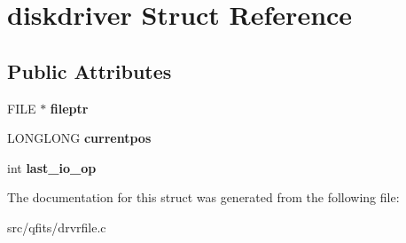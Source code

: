 \hypertarget{structdiskdriver}{}\section{diskdriver Struct Reference}
\label{structdiskdriver}
\subsection*{Public Attributes}
\begin{DoxyCompactItemize}
\item 
\mbox{\label{structdiskdriver_a05c1fe5955b89968b998b4331041f044}} 
F\+I\+LE $\ast$ {\bfseries fileptr}
\item 
\mbox{\label{structdiskdriver_afc771fe1c6668f0a0c5694b8d6cd4573}} 
L\+O\+N\+G\+L\+O\+NG {\bfseries currentpos}
\item 
\mbox{\label{structdiskdriver_a16b447ba774b2c0f840cc802345619b2}} 
int {\bfseries last\+\_\+io\+\_\+op}
\end{DoxyCompactItemize}


The documentation for this struct was generated from the following file\+:\begin{DoxyCompactItemize}
\item 
src/qfits/drvrfile.\+c\end{DoxyCompactItemize}
